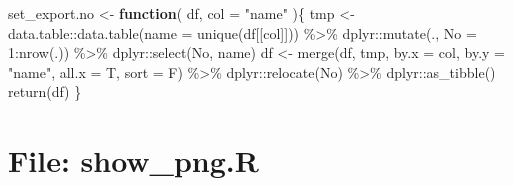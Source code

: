 \documentclass[
]{article}
\newenvironment{Shaded}{\begin{snugshade}}{\end{snugshade}}
\newcommand{\AttributeTok}[1]{\textcolor[rgb]{0.77,0.63,0.00}{#1}}
\newcommand{\ControlFlowTok}[1]{\textcolor[rgb]{0.13,0.29,0.53}{\textbf{#1}}}
\newcommand{\DecValTok}[1]{\textcolor[rgb]{0.00,0.00,0.81}{#1}}
\newcommand{\FunctionTok}[1]{\textcolor[rgb]{0.00,0.00,0.00}{#1}}
\newcommand{\NormalTok}[1]{#1}
\newcommand{\OtherTok}[1]{\textcolor[rgb]{0.56,0.35,0.01}{#1}}
\newcommand{\SpecialCharTok}[1]{\textcolor[rgb]{0.00,0.00,0.00}{#1}}
\newcommand{\StringTok}[1]{\textcolor[rgb]{0.31,0.60,0.02}{#1}}
\begin{document}
\begin{Shaded}
\begin{Highlighting}[]
\NormalTok{set\_export.no }\OtherTok{\textless{}{-}} 
  \ControlFlowTok{function}\NormalTok{(}
\NormalTok{           df,}
           \AttributeTok{col =} \StringTok{"name"}
\NormalTok{           )\{}
\NormalTok{    tmp }\OtherTok{\textless{}{-}}\NormalTok{ data.table}\SpecialCharTok{::}\FunctionTok{data.table}\NormalTok{(}\AttributeTok{name =} \FunctionTok{unique}\NormalTok{(df[[col]])) }\SpecialCharTok{\%\textgreater{}\%} 
\NormalTok{      dplyr}\SpecialCharTok{::}\FunctionTok{mutate}\NormalTok{(., }\AttributeTok{No =} \DecValTok{1}\SpecialCharTok{:}\FunctionTok{nrow}\NormalTok{(.)) }\SpecialCharTok{\%\textgreater{}\%} 
\NormalTok{      dplyr}\SpecialCharTok{::}\FunctionTok{select}\NormalTok{(No, name)}
\NormalTok{    df }\OtherTok{\textless{}{-}} \FunctionTok{merge}\NormalTok{(df, tmp, }\AttributeTok{by.x =}\NormalTok{ col, }\AttributeTok{by.y =} \StringTok{"name"}\NormalTok{, }\AttributeTok{all.x =}\NormalTok{ T, }\AttributeTok{sort =}\NormalTok{ F) }\SpecialCharTok{\%\textgreater{}\%} 
\NormalTok{      dplyr}\SpecialCharTok{::}\FunctionTok{relocate}\NormalTok{(No) }\SpecialCharTok{\%\textgreater{}\%} 
\NormalTok{      dplyr}\SpecialCharTok{::}\FunctionTok{as\_tibble}\NormalTok{()}
    \FunctionTok{return}\NormalTok{(df)}
\NormalTok{  \}}
\end{Highlighting}
\end{Shaded}

\hypertarget{file-show_png.r}{%
\section{File: show\_png.R}\label{file-show_png.r}}
\end{document}
